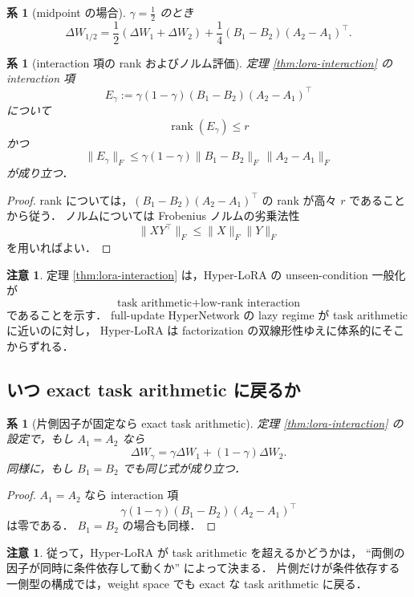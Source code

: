 \documentclass[a4paper,11pt]{bxjsarticle}
\newtheorem{corollary}[theorem]{系}
\theoremstyle{definition}
\newtheorem{remark}[theorem]{注意}
\DeclareMathOperator{\rank}{rank}
\begin{document}
\begin{corollary}[midpoint の場合]
\label{cor:lora-midpoint}
$\gamma=\frac12$ のとき
\[
\Delta W_{1/2}
=
\frac12(\Delta W_1+\Delta W_2)
+
\frac14(B_1-B_2)(A_2-A_1)^\top.
\]
\end{corollary}

\begin{corollary}[interaction 項の rank およびノルム評価]
\label{cor:lora-rank-bound}
定理 \ref{thm:lora-interaction} の interaction 項
\[
E_\gamma:=\gamma(1-\gamma)(B_1-B_2)(A_2-A_1)^\top
\]
について
\[
\rank(E_\gamma)\le r
\]
かつ
\[
\|E_\gamma\|_F
\le
\gamma(1-\gamma)\|B_1-B_2\|_F\,\|A_2-A_1\|_F
\]
が成り立つ．
\end{corollary}

\begin{proof}
rank については，$(B_1-B_2)(A_2-A_1)^\top$ の rank が高々 $r$ であることから従う．
ノルムについては Frobenius ノルムの劣乗法性
\[
\|XY^\top\|_F\le \|X\|_F\|Y\|_F
\]
を用いればよい．
\end{proof}

\begin{remark}
定理 \ref{thm:lora-interaction} は，Hyper-LoRA の unseen-condition 一般化が
\[
\text{task arithmetic} + \text{low-rank interaction}
\]
であることを示す．
full-update HyperNetwork の lazy regime が task arithmetic に近いのに対し，
Hyper-LoRA は factorization の双線形性ゆえに体系的にそこからずれる．
\end{remark}

\subsection{いつ exact task arithmetic に戻るか}

\begin{corollary}[片側因子が固定なら exact task arithmetic]
\label{cor:one-sided}
定理 \ref{thm:lora-interaction} の設定で，もし $A_1=A_2$ なら
\[
\Delta W_\gamma=\gamma\Delta W_1+(1-\gamma)\Delta W_2.
\]
同様に，もし $B_1=B_2$ でも同じ式が成り立つ．
\end{corollary}

\begin{proof}
$A_1=A_2$ なら interaction 項
\[
\gamma(1-\gamma)(B_1-B_2)(A_2-A_1)^\top
\]
は零である．
$B_1=B_2$ の場合も同様．
\end{proof}

\begin{remark}
従って，Hyper-LoRA が task arithmetic を超えるかどうかは，
``両側の因子が同時に条件依存して動くか'' によって決まる．
片側だけが条件依存する一側型の構成では，weight space でも exact な task arithmetic に戻る．
\end{remark}
\end{document}
